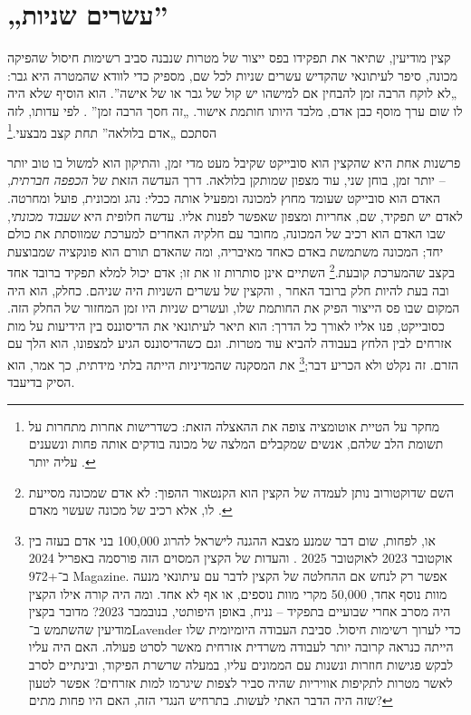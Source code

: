 \chapter{„עשרים שניות”}
\label{sec:1}
קצין מודיעין, שתיאר את תפקידו בפס ייצור של מטרות שנבנה סביב רשימות חיסול שהפיקה מכונה, סיפר לעיתונאי שהקדיש עשרים שניות לכל שם, מספיק כדי לוודא שהמטרה היא גבר: „לא לוקח הרבה זמן להבחין אם למישהו יש קול של גבר או של אישה”. הוא הוסיף שלא היה לו שום ערך מוסף כבן אדם, מלבד היותו חותמת אישור. „זה חסך הרבה זמן” \autocite{abraham2024lavender}. לפי עדותו, לזה הסתכם „אדם בלולאה” תחת קצב מבצעי.\footnote{מחקר על הטיית אוטומציה צופה את ההאצלה הזאת: כשדרישות אחרות מתחרות על תשומת הלב שלהם, אנשים שמקבלים המלצה של מכונה בודקים אותה פחות ונשענים עליה יותר \autocite{parasuraman2010complacency}.}

פרשנות אחת היא שהקצין הוא סובייקט שקיבל מעט מדי זמן, והתיקון הוא למשול בו טוב יותר – יותר זמן, בוחן שני, עוד מצפון שמותקן בלולאה. דרך העדשה הזאת של \emph{הכפפה חברתית}, האדם הוא סובייקט שעומד מחוץ למכונה ומפעיל אותה ככלי: נהג ומכונית, פועל ומחרטה. לאדם יש תפקיד, שם, אחריות ומצפון שאפשר לפנות אליו. עדשה חלופית היא \emph{שעבוד מכונתי}, שבו האדם הוא רכיב של המכונה, מחובר עם חלקיה האחרים למערכת שמווסתת את כולם יחד; המכונה משתמשת באדם כאחד מאיבריה, ומה שהאדם תורם הוא פונקציה שמבוצעת בקצב שהמערכת קובעת.\footnote{השם שדוקטורוב נותן לעמדה של הקצין הוא הקנטאור ההפוך: לא אדם שמכונה מסייעת לו, אלא רכיב של מכונה שעשוי מאדם \autocite{doctorow2026reversecentaur}.} השתיים אינן סותרות זו את זו; אדם יכול למלא תפקיד ברובד אחד ובה בעת להיות חלק ברובד האחר \autocite[מישור 13, „The Apparatus of Capture”: יש שעבוד כאשר בני אדם הם עצמם חלקים מכוננים של מכונה שהם מרכיבים בינם לבין עצמם ועם דברים אחרים, תחת שליטתה והכוונתה של אחדות עליונה, ויש הכפפה כאשר האחדות העליונה מכוננת את האדם כסובייקט הקשור לאובייקט חיצוני חדש, שיכול להיות בעל חיים, כלי או אפילו מכונה]{deleuze1987plateaus}, והקצין של עשרים השניות היה שניהם. כחלק, הוא היה המקום שבו פס הייצור הפיק את החותמת שלו, ועשרים שניות היו זמן המחזור של החלק הזה. כסובייקט, פנו אליו לאורך כל הדרך: הוא תיאר לעיתונאי את הדיסוננס בין הידיעות על מות אזרחים לבין הלחץ בעבודה להביא עוד מטרות. וגם כשהדיסוננס הגיע למצפונו, הוא הלך עם הזרם. זה נקלט ולא הכריע דבר;\footnote{או, לפחות, שום דבר שמנע מצבא ההגנה לישראל להרוג 100,000 בני אדם בעזה בין אוקטובר 2023 לאוקטובר 2025 \autocite{gomezugarte2025uncertainty,acosta2026gaza,economist2025gaza}. והעדות של הקצין המסוים הזה פורסמה באפריל 2024 ב־+972 Magazine. אפשר רק לנחש אם ההחלטה של הקצין לדבר עם עיתונאי מנעה מוות נוסף אחד, 50,000 מקרי מוות נוספים, או אף לא אחד. ומה היה קורה אילו הקצין היה מסרב אחרי שבועיים בתפקיד – נניח, באופן היפותטי, בנובמבר 2023? מדובר בקצין מודיעין שהשתמש ב־Lavender כדי לערוך רשימות חיסול. סביבת העבודה היומיומית שלו הייתה כנראה קרובה יותר לעבודה משרדית אזרחית מאשר לסרט פעולה. האם היה עליו לבקש פגישות חוזרות ונשנות עם הממונים עליו, במעלה שרשרת הפיקוד, ובינתיים לסרב לאשר מטרות לתקיפות אוויריות שהיה סביר לצפות שיגרמו למות אזרחים? אפשר לטעון שזה היה הדבר האתי לעשות. בתרחיש הנגדי הזה, האם היו פחות מתים?} את המסקנה שהמדיניות הייתה בלתי מידתית, כך אמר, הוא הסיק בדיעבד.

